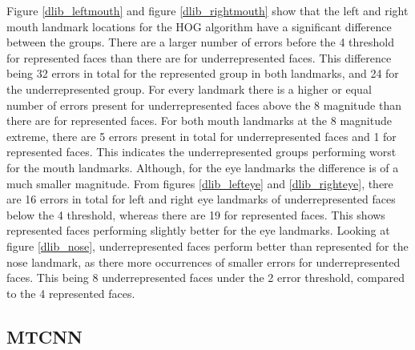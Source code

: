 \documentclass{l4proj}
\begin{document}
Figure \ref{dlib_leftmouth} and figure \ref{dlib_rightmouth} show that the left and right mouth landmark locations for the HOG algorithm have a significant difference between the groups. There are a larger number of errors before the 4 threshold for represented faces than there are for underrepresented faces. This difference being 32 errors in total for the represented group in both landmarks, and 24 for the underrepresented group. For every landmark there is a higher or equal number of errors present for underrepresented faces above the 8 magnitude than there are for represented faces. For both mouth landmarks at the 8 magnitude extreme, there are 5 errors present in total for underrepresented faces and 1 for represented faces. This indicates the underrepresented groups performing worst for the mouth landmarks. Although, for the eye landmarks the difference is of a much smaller magnitude. From figures \ref{dlib_lefteye} and \ref{dlib_righteye}, there are 16 errors in total for left and right eye landmarks of underrepresented faces below the 4 threshold, whereas there are 19 for represented faces. This shows represented faces performing slightly better for the eye landmarks. Looking at figure \ref{dlib_nose}, underrepresented faces perform better than represented for the nose landmark, as there more occurrences of smaller errors for underrepresented faces. This being 8 underrepresented faces under the 2 error threshold, compared to the 4 represented faces. 


\subsection{MTCNN}
\end{document}
